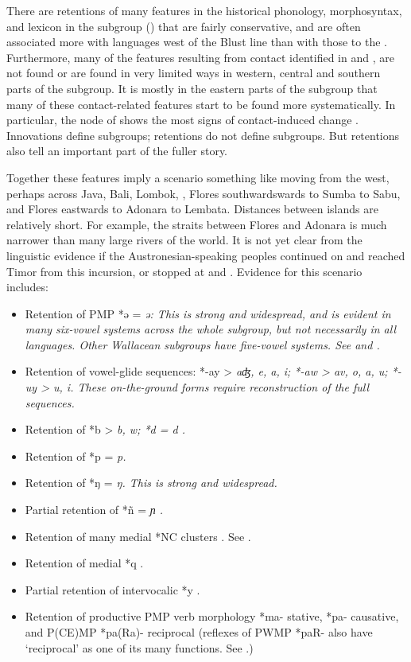 There are retentions of many features in the historical phonology,
morphosyntax, and lexicon in the  subgroup
() that are fairly conservative,
and are often associated more with languages west of the Blust
line than with those to the .
Furthermore, many of the features resulting
from contact identified in  and ,
are not found or are found in very limited ways in western,
central and southern parts of the  subgroup.
It is mostly in the eastern parts of the subgroup that many of
these contact-related features start to be found more systematically.
In particular, the  node of 
shows the most signs of contact-induced change \citep{Fricke2019}.
Innovations define subgroups; retentions do not define subgroups.
But retentions also tell an important part of the fuller story.

Together these features imply a scenario something like moving
from the west, perhaps across Java, Bali,
Lombok, , Flores southwardswards to Sumba to Sabu,
and Flores eastwards to Adonara to Lembata.
Distances between islands are relatively short.
For example, the straits between Flores
and Adonara is much narrower than many large rivers of the world.
It is not yet clear from the linguistic evidence if the Austronesian-speaking
peoples continued on and reached Timor from this incursion,
or stopped at  and .
Evidence for this scenario includes:

\begin{itemize}
	\item	Retention of PMP *ə = \it{ə}: This is strong
				and widespread, and is evident in many six-vowel systems across
				the whole subgroup, but not necessarily in all languages.
				Other Wallacean subgroups have five-vowel systems.
				See  and .
	\item	Retention of vowel-glide sequences: *-ay > \it{aʤ,
				e, a, i}; *-aw > \it{av,
				o, a,} \it{u}; *-uy > \it{u, i}.
				These on-the-ground forms require reconstruction of the full sequences.
	\item	Retention of *b > \it{b,
				w}; *d = \it{d} \citep[56, 85f]{Blust2008}.
	\item	Retention of *p = \it{p}.
	\item	Retention of *ŋ = \it{ŋ}.
				This is strong and widespread.
	\item	Partial retention of *ñ = \it{ɲ} \citep[57, 68]{Blust2008}.
	\item	Retention of many medial *NC clusters \citep[54]{Blust2008}. See .
	\item	Retention of medial *q \citep[76f, 85]{Blust2008}.
	\item	Partial retention of intervocalic *y \citep[88]{Blust2008}.
	\item	Retention of productive PMP verb morphology *ma- stative,
				*pa- causative, and P(CE)MP *pa(Ra)- reciprocal (reflexes of
				PWMP *paR- also have ‘reciprocal’ as one of its many functions.
				See .) 
\end{itemize}

